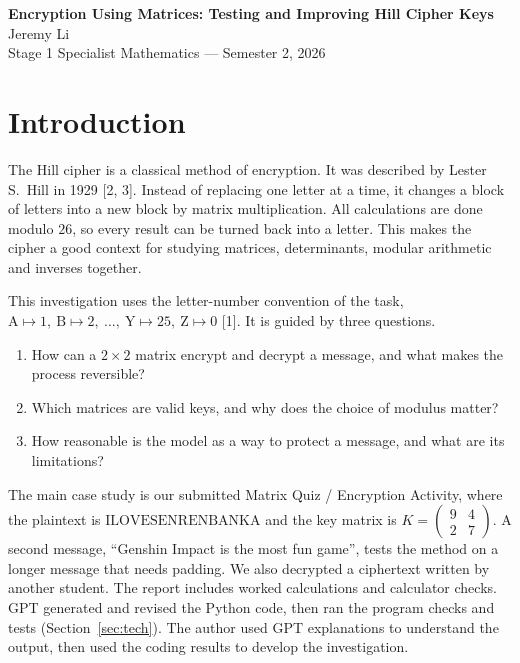 \documentclass[11pt,a4paper]{article}
\newcommand{\smat}[1]{\left(\begin{smallmatrix}#1\end{smallmatrix}\right)}
\theoremstyle{plain}
\theoremstyle{definition}
\begin{document}
\begin{center}
    {\Large\textbf{Encryption Using Matrices: Testing and Improving Hill Cipher Keys}}\\[0.2em]
    {\large Jeremy Li}\\[0.1em]
    Stage 1 Specialist Mathematics --- Semester 2, 2026
\end{center}

\section{Introduction}

The Hill cipher is a classical method of encryption. It was described by Lester S.\ Hill in 1929 [2, 3]. Instead of replacing one letter at a time, it changes a block of letters into a new block by matrix multiplication. All calculations are done modulo $26$, so every result can be turned back into a letter. This makes the cipher a good context for studying matrices, determinants, modular arithmetic and inverses together.

This investigation uses the letter-number convention of the task, $\text{A}\mapsto1,\ \text{B}\mapsto2,\ \ldots,\ \text{Y}\mapsto25,\ \text{Z}\mapsto0$ [1]. It is guided by three questions.
\begin{enumerate}
\item How can a $2\times2$ matrix encrypt and decrypt a message, and what makes the process reversible?
\item Which matrices are valid keys, and why does the choice of modulus matter?
\item How reasonable is the model as a way to protect a message, and what are its limitations?
\end{enumerate}

The main case study is our submitted Matrix Quiz / Encryption Activity, where the plaintext is $\text{ILOVESENRENBANKA}$ and the key matrix is $K=\smat{9&4\\2&7}$. A second message, ``Genshin Impact is the most fun game'', tests the method on a longer message that needs padding. We also decrypted a ciphertext written by another student. The report includes worked calculations and calculator checks. GPT generated and revised the Python code, then ran the program checks and tests (Section~\ref{sec:tech}). The author used GPT explanations to understand the output, then used the coding results to develop the investigation.
\end{document}
